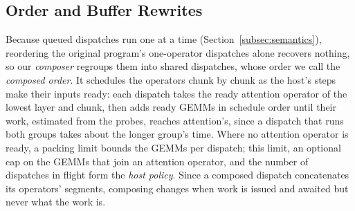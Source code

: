\subsection{Order and Buffer Rewrites}
\label{subsec:order}
\label{subsec:compose}

Because queued dispatches run one at a time (Section~\ref{subsec:semantics}), reordering the original program's one-operator dispatches alone recovers nothing, so our \emph{composer} regroups them into shared dispatches, whose order we call the \emph{composed order}.
It schedules the operators chunk by chunk as the host's steps make their inputs ready: each dispatch takes the ready attention operator of the lowest layer and chunk, then adds ready GEMMs in schedule order until their work, estimated from the probes, reaches attention's, since a dispatch that runs both groups takes about the longer group's time.
Where no attention operator is ready, a packing limit bounds the GEMMs per dispatch; this limit, an optional cap on the GEMMs that join an attention operator, and the number of dispatches in flight form the \emph{host policy}.
Since a composed dispatch concatenates its operators' segments, composing changes when work is issued and awaited but never what the work is.

